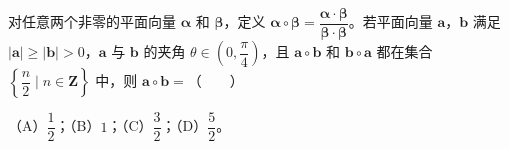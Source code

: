 \begin{question}
对任意两个非零的平面向量 $\boldsymbol\alpha$ 和 $\boldsymbol\beta$，定义 $\boldsymbol\alpha\circ\boldsymbol\beta=\dfrac{\boldsymbol\alpha\cdot\boldsymbol\beta}{\boldsymbol\beta\cdot\boldsymbol\beta}$。若平面向量 $\boldsymbol a$，$\boldsymbol b$ 满足 $|\boldsymbol a|\geqslant|\boldsymbol b|>0$，$\boldsymbol a$ 与 $\boldsymbol b$ 的夹角 $\theta\in\left(0,\dfrac\pi4\right)$，且 $\boldsymbol a\circ\boldsymbol b$ 和 $\boldsymbol b\circ\boldsymbol a$ 都在集合 $\left\{\dfrac n2\mid n\in\mathbf Z\right\}$ 中，则 $\boldsymbol a\circ\boldsymbol b=$\mbox{（　　）}

（A）$\dfrac12$；（B）$1$；（C）$\dfrac32$；（D）$\dfrac52$。

\end{question}

